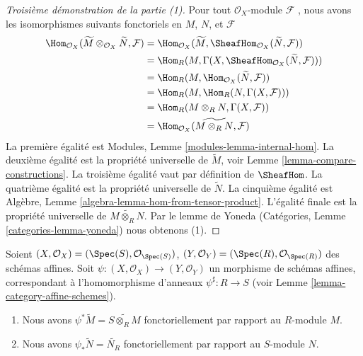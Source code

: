 \begin{proof}[ Troisième démonstration de la partie (1)]
Pour tout  $\mathcal{O}_X$-module  $\mathcal{F}$ , nous avons les isomorphismes suivants
fonctoriels en  $M$,  $N$, et  $\mathcal{F}$
\begin{align*}
\Hom_{\mathcal{O}_X}(\widetilde{M} \otimes _{\mathcal{O} _X} \widetilde{N},
\mathcal{F})
& =
\Hom_{\mathcal{O}_X}(\widetilde{M},
\SheafHom_{\mathcal{O} _X} (\widetilde{N}, \mathcal{F})) \\
& =
\Hom_R(M, \Gamma(X,
\SheafHom_{\mathcal{O}_X}(\widetilde{N}, \mathcal{F}))) \\
& =
\Hom_R(M, \Hom_{\mathcal{O}_X}(\widetilde{N}, \mathcal{F})) \\
& =
\Hom_R(M, \Hom_R(N, \Gamma(X,\mathcal{F}))) \\
& =
\Hom_R(M \otimes_R N, \Gamma(X, \mathcal{F})) \\
& =
\Hom_{\mathcal{O}_X}(\widetilde{M \otimes_R N}, \mathcal{F})
\end{align*}
La première égalité est Modules, Lemme  \ref{modules-lemma-internal-hom}. La deuxième égalité est la
propriété universelle de  $\widetilde{M}$, voir Lemme  \ref{lemma-compare-constructions}. La troisième
égalité vaut par définition de  $\SheafHom$. La quatrième égalité est la
propriété universelle de  $\widetilde{N}$. La cinquième égalité est Algèbre, Lemme
 \ref{algebra-lemma-hom-from-tensor-product}. L'égalité finale est la propriété universelle de  $\widetilde{M \otimes_R N}$. Par
le lemme de Yoneda (Catégories, Lemme  \ref{categories-lemma-yoneda}) nous obtenons (1).
\end{proof}

\begin{lemma}
\label{lemma-widetilde-pullback}
Soient  $(X, \mathcal{O}_X) = (\Spec(S), \mathcal{O}_{\Spec(S)})$,  $(Y, \mathcal{O}_Y) = (\Spec(R), \mathcal{O}_{\Spec(R)})$  des schémas affines. Soit  $\psi : (X, \mathcal{O}_X) \to (Y, \mathcal{O}_Y)$  un
morphisme de schémas affines, correspondant à l'homomorphisme d'anneaux  $\psi^\sharp : R \to S$ 
(voir Lemme  \ref{lemma-category-affine-schemes}).
\begin{enumerate}
\item Nous avons  $\psi^* \widetilde M = \widetilde{S \otimes_R M}$  fonctoriellement par rapport au  $R$-module  $M$.
\item Nous avons  $\psi_* \widetilde N = \widetilde{N_R}$  fonctoriellement par rapport au  $S$-module  $N$.
\end{enumerate}
\end{lemma}

